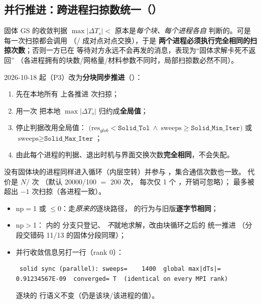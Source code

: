 \subsection{并行推进：跨进程扫掠数统一（）}
\label{sec:solid_parallel}
固体 GS 的收敛判据 $\max\lvert\Delta T_s\rvert<$ 原本是\emph{每个块、每个进程各自}
判断的。可是每一次扫掠都会调用 （/
成对点对点交换），于是 \textbf{两个进程必须执行完全相同的扫掠次数}；否则一方已在
 等待对方永远不会再发的消息，表现为“固体求解卡死不返回”
（各进程拥有的块数/网格量/材料参数不同时，局部扫掠数必然不同）。

2026-10-18 起（P3）改为\textbf{分块同步推进}（）：
\begin{enumerate}
  \item 先在本地所有  上各推进  次扫掠；
  \item 用一次  把本地 $\max\lvert\Delta T_s\rvert$ 归约成\textbf{全局值}；
  \item 停止判据改用全局值：
        $\big(\text{res}_{glob}<\texttt{Solid\_Tol}\ \wedge\ \text{sweeps}\ge\texttt{Solid\_Min\_Iter}\big)$
        或 $\text{sweeps}\ge\texttt{Solid\_Max\_Iter}$；
  \item 由此每个进程的判据、退出时机与界面交换次数\textbf{完全相同}，不会失配。
\end{enumerate}
没有固体块的进程同样进入循环（内层空转）并参与 ，集合通信次数也一致。
代价是 $N/$ 次 （默认 20000/100 $=$ 200 次，
每次仅 1 个 ，开销可忽略）； 最多被超出
$-1$ 次扫掠（各进程一致）。

\begin{itemize}
  \item np$=$1 或 $\le0$：走\emph{原来的}逐块路径，
         的行为与旧版\textbf{逐字节相同}；
  \item np$>$1： 内的  分支只登记、
        \emph{不}就地求解，改由块循环之后的  统一推进
        （分段交错码 11/13 的固体分段同理）；
  \item 并行收敛信息另打一行（rank 0）：
\begin{lstlisting}
 solid sync (parallel): sweeps=    1400  global max|dTs|= 0.91234567E-09  converged= T  (identical on every MPI rank)
\end{lstlisting}
        逐块的  行语义不变（仍是该块/该进程的值）。
\end{itemize}

